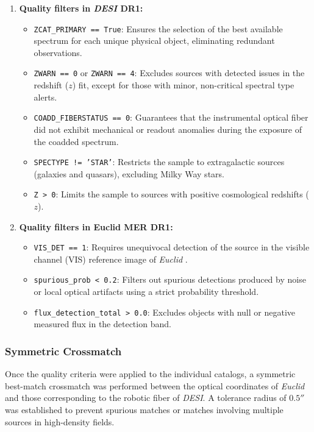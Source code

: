 \begin{enumerate}
\item \textbf{Quality filters in \textit{\gls{DESI}} DR1:}
    \begin{itemize}
    \item \texttt{ZCAT\_PRIMARY == True}: Ensures the selection of the best available spectrum for each unique physical object, eliminating redundant observations.
    \item \texttt{ZWARN == 0} or \texttt{ZWARN == 4}: Excludes sources with detected issues in the redshift ($z$) fit, except for those with minor, non-critical spectral type alerts.
    \item \texttt{COADD\_FIBERSTATUS == 0}: Guarantees that the instrumental optical fiber did not exhibit mechanical or readout anomalies during the exposure of the coadded spectrum.
    \item \texttt{SPECTYPE != 'STAR'}: Restricts the sample to extragalactic sources (galaxies and quasars), excluding Milky Way stars.
    \item \texttt{Z > 0}: Limits the sample to sources with positive cosmological redshifts ($z$).
    \end{itemize}

\item \textbf{Quality filters in Euclid MER DR1:}
    \begin{itemize}
    \item \texttt{VIS\_DET == 1}: Requires unequivocal detection of the source in the visible channel (VIS) reference image of \textit{Euclid} \autocite{ar:cropper-2024}.
    \item \texttt{spurious\_prob < 0.2}: Filters out spurious detections produced by noise or local optical artifacts using a strict probability threshold.
    \item \texttt{flux\_detection\_total > 0.0}: Excludes objects with null or negative measured flux in the detection band.
    \end{itemize}
\end{enumerate}

\subsubsection{Symmetric Crossmatch}

Once the quality criteria were applied to the individual catalogs, a symmetric best-match crossmatch was performed between the optical coordinates of \textit{Euclid} and those corresponding to the robotic fiber of \textit{\gls{DESI}}. A tolerance radius of $0.5''$ was established to prevent spurious matches or matches involving multiple sources in high-density fields.

